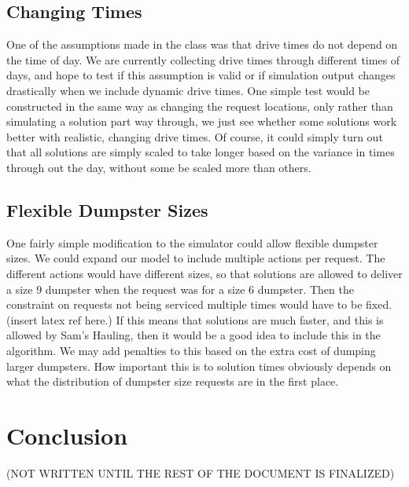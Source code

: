 \documentclass{article}
\begin{document}


\subsection{Changing Times}
One of the assumptions made in the class was that drive times do not depend on the time of day.
We are currently collecting drive times through different times of days, and hope to test if this assumption is valid or if simulation output changes drastically when we include dynamic drive times.
One simple test would be constructed in the same way as changing the request locations, only rather than simulating a solution part way through, we just see whether some solutions work better with realistic, changing drive times.
Of course, it could simply turn out that all solutions are simply scaled to take longer based on the variance in times through out the day, without some be scaled more than others.

\subsection{Flexible Dumpster Sizes}
One fairly simple modification to the simulator could allow flexible dumpster sizes.
We could expand our model to include multiple actions per request.
The different actions would have different sizes, so that solutions are allowed to deliver a size $9$ dumpster when the request was for a size $6$ dumpster.
Then the constraint on requests not being serviced multiple times would have to be fixed. (insert latex ref here.)
If this means that solutions are much faster, and this is allowed by Sam's Hauling, then it would be a good idea to include this in the algorithm.
We may add penalties to this based on the extra cost of dumping larger dumpsters.
How important this is to solution times obviously depends on what the distribution of dumpster size requests are in the first place.



\section{Conclusion}

(NOT WRITTEN UNTIL THE REST OF THE DOCUMENT IS FINALIZED)
\end{document}
